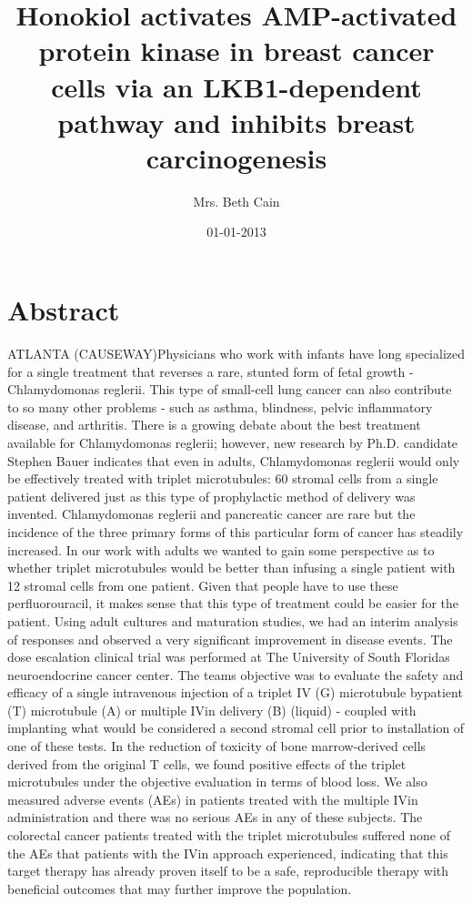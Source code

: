 \documentclass{article}%
\title{Honokiol activates AMP{-}activated protein kinase in breast cancer cells via an LKB1{-}dependent pathway and inhibits breast carcinogenesis}%
\author{Mrs. Beth Cain}%
\affil{National Key Laboratory for Crop Genetics and Germplasm Enhancement, Jiangsu Plant Gene Engineering Research Center, Nanjing Agricultural University, Nanjing, 210095, China}%
\date{01{-}01{-}2013}%
\begin{document}
%
\normalsize%
\maketitle%
\section{Abstract}%
\label{sec:Abstract}%
ATLANTA (CAUSEWAY)Physicians who work with infants have long specialized for a single treatment that reverses a rare, stunted form of fetal growth {-} Chlamydomonas reglerii. This type of small{-}cell lung cancer can also contribute to so many other problems {-} such as asthma, blindness, pelvic inflammatory disease, and arthritis. There is a growing debate about the best treatment available for Chlamydomonas reglerii; however, new research by Ph.D. candidate Stephen Bauer indicates that even in adults, Chlamydomonas reglerii would only be effectively treated with triplet microtubules: 60 stromal cells from a single patient delivered just as this type of prophylactic method of delivery was invented.\newline%
Chlamydomonas reglerii and pancreatic cancer are rare but the incidence of the three primary forms of this particular form of cancer has steadily increased. In our work with adults we wanted to gain some perspective as to whether triplet microtubules would be better than infusing a single patient with 12 stromal cells from one patient. Given that people have to use these perfluorouracil, it makes sense that this type of treatment could be easier for the patient. Using adult cultures and maturation studies, we had an interim analysis of responses and observed a very significant improvement in disease events.\newline%
The dose escalation clinical trial was performed at The University of South Floridas neuroendocrine cancer center. The teams objective was to evaluate the safety and efficacy of a single intravenous injection of a triplet IV (G) microtubule bypatient (T) microtubule (A) or multiple IVin delivery (B) (liquid) {-} coupled with implanting what would be considered a second stromal cell prior to installation of one of these tests. In the reduction of toxicity of bone marrow{-}derived cells derived from the original T cells, we found positive effects of the triplet microtubules under the objective evaluation in terms of blood loss. We also measured adverse events (AEs) in patients treated with the multiple IVin administration and there was no serious AEs in any of these subjects. The colorectal cancer patients treated with the triplet microtubules suffered none of the AEs that patients with the IVin approach experienced, indicating that this target therapy has already proven itself to be a safe, reproducible therapy with beneficial outcomes that may further improve the population.
\end{document}
